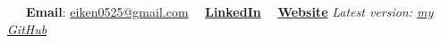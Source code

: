 \documentclass[letterpaper, 11pt]{article}
\begin{document}


\vspace{0.5cm}
\noindent\:\ \ \ 
\textbf{Email}: \href{mailto:eiken0525@gmail.com}{eiken0525@gmail.com} 
\qquad \ \ 
\href{https://www.linkedin.com/in/eiken59}{\textbf{LinkedIn}} 
\qquad \ \ 
\href{https://eiken59.github.io}{\textbf{Website}}
\hfill 
\textit{\footnotesize Latest version: \href{https://github.com/eiken59/CV/blob/main/eiken59_CV.pdf}{my GitHub}\ \ \ \ }
\vspace{0.2cm}

\end{document}
